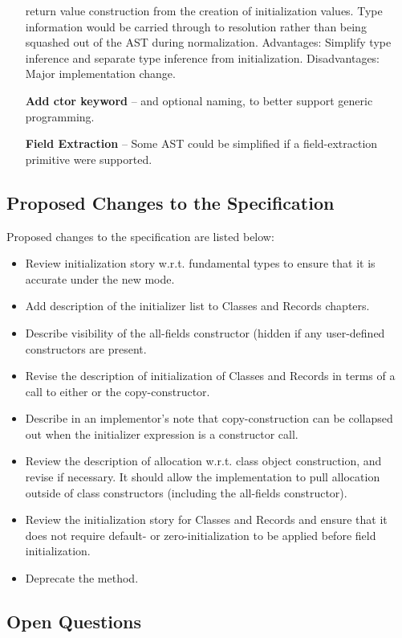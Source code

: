 \begin{itemize}[leftmargin=2.5cm]
  return value construction from the creation of initialization values.  Type information
  would be carried through to resolution rather than being squashed out of the AST during
  normalization.  Advantages: Simplify type inference and separate type inference from
  initialization.  Disadvantages: Major implementation change.
\item[\bf Add ctor keyword] -- and optional naming, to better support generic
  programming.
\item[\bf Field Extraction] -- Some AST could be simplified if a field-extraction primitive
  were supported.
\end{itemize}

\subsection{Proposed Changes to the Specification}
Proposed changes to the specification are listed below:
\begin{itemize}[itemsep=0pt]
\item Review initialization story w.r.t. fundamental types to ensure that it is accurate
  under the new mode.
\item Add description of the initializer list to Classes and Records chapters.
\item Describe visibility of the all-fields constructor (hidden if any user-defined
  constructors are present.
\item Revise the description of initialization of Classes and Records in terms of a call to
  either  or the copy-constructor.
\item Describe in an implementor's note that copy-construction can be collapsed out when
  the initializer expression is a constructor call.
\item Review the description of allocation w.r.t. class object construction, and revise if
  necessary.  It should allow the implementation to pull allocation outside of class
  constructors (including the all-fields constructor).
\item Review the initialization story for Classes and Records and ensure that it does not
  require default- or zero-initialization to be applied before field initialization.
\item Deprecate the  method.
\end{itemize}

\subsection{Open Questions}

